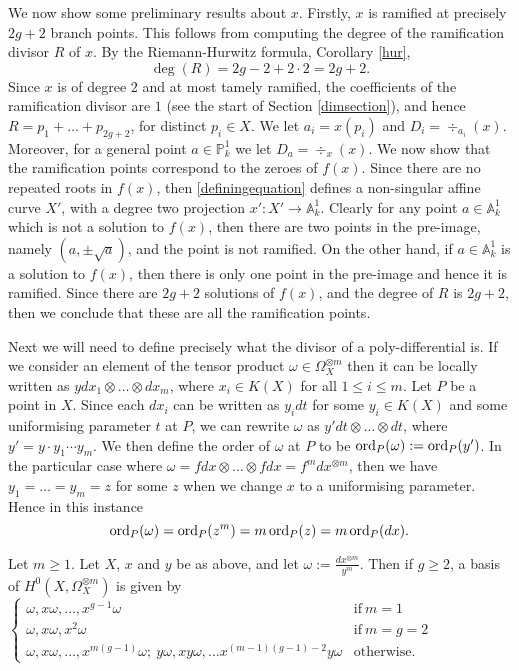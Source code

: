 We now show some preliminary results about $x$. 
Firstly, $x$ is ramified at precisely $2g + 2$ branch points.
This follows from computing the degree of the ramification divisor $R$ of $x$.
By the Riemann-Hurwitz formula, Corollary \ref{hur},
    \[ 
    \deg(R) = 2g -2 +2\cdot 2 = 2g + 2.
    \]
Since $x$ is of degree $2$ and at most tamely ramified, the coefficients of the ramification divisor are $1$ (see the start of Section \ref{dimsection}), and hence $R = p_1 + \ldots + p_{2g+2}$, for distinct $p_i\in X$.
We let $a_i = x(p_i)$ and $D_i = \div_{a_i}(x)$.
Moreover, for a general point $a \in \mathbb P_k^1$ we let $D_a = \div_x(x)$.
We now show that the ramification points correspond to the zeroes of $f(x)$.
Since there are no repeated roots in $f(x)$, then \eqref{definingequation} defines a non-singular affine curve $X'$, with a degree two projection $x': X'\rightarrow \mathbb A_k^1$.
Clearly for any point $a\in \mathbb A_k^1$ which is not a solution to $f(x)$, then there are two points in the pre-image, namely $(a,\pm \sqrt{a})$, and the point is not ramified.
On the other hand, if $a\in \mathbb A_k^1$ is a solution to $f(x)$, then there is only one point in the pre-image and hence it is ramified.
Since there are $2g+2$ solutions of $f(x)$, and the degree of $R$ is $2g+2$, then we conclude that these are all the ramification points.

Next we will need to define precisely what the divisor of a poly-differential is.
If we consider an element of the tensor product $\omega \in \Omega_X^{\otimes m}$ then it can be locally written as $y dx_1\otimes \ldots \otimes dx_m$, where $x_i \in K(X)$ for all $1 \leq i \leq m$.
Let $P$ be a point in $X$.
Since each $dx_i$ can be written as $y_i dt$ for some $y_i\in K(X)$ and some uniformising parameter $t$ at $P$, we can rewrite $\omega$ as $y' dt \otimes \ldots \otimes dt$, where $y' = y \cdot y_1 \cdots y_m$.
We then define the order of $\omega$ at $P$ to be $\operatorname{ord}_P(\omega ) := \operatorname{ord}_P(y')$.
In the particular case where $\omega = fdx \otimes \ldots \otimes fdx = f^m dx^{\otimes m}$, then we have $y_1 = \ldots = y_m = z$ for some $z$ when we change $x$ to a uniformising parameter.
Hence in this instance 
    \[ 
    \operatorname{ord}_P(\omega) = \operatorname{ord}_P(z^m) = m\operatorname{ord}_P(z) = m\operatorname{ord}_P(dx).
    \]



    \begin{prop}\label{propneq2}
    Let $m\geq 1$.
    Let $X$, $x$ and $y$ be as above, and let $\omega := \frac{dx^{\otimes m}}{y^m}$. 
    Then if $g\geq 2$, a basis of $H^0(X,\Omega_X^{\otimes m})$ is given by
        $\begin{cases}
        \omega, x\omega, \ldots , x^{g-1}\omega &  \mbox{if}\ m=1 \\
        \omega, x\omega, x^2\omega & \mbox{if}\ m=g=2 \\
        \omega, x\omega, \ldots, x^{m(g-1)}\omega;\  y\omega, xy\omega, \ldots x^{(m-1)(g-1)-2}y\omega & \mbox{otherwise.}
        \end{cases}$
    \end{prop}
    
